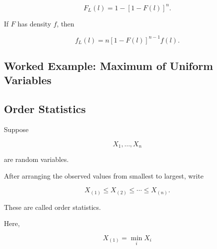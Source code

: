 \[
\boxed{
F_L(l)
=
1-[1-F(l)]^n.
}
\]

If \(F\) has density \(f\), then

\[
\boxed{
f_L(l)
=
n
[1-F(l)]^{n-1}
f(l).
}
\]

\subsection{Worked Example: Maximum of Uniform Variables}
\label{subsec:worked-maximum-uniform}


\subsection{Order Statistics}
\label{subsec:order-statistics}

Suppose

\[
X_1,\ldots,X_n
\]

are random variables.

After arranging the observed values from smallest to largest, write

\[
\boxed{
X_{(1)}
\leq
X_{(2)}
\leq
\cdots
\leq
X_{(n)}.
}
\]

These are called order statistics.

Here,

\[
X_{(1)}
=
\min_i X_i
\]

